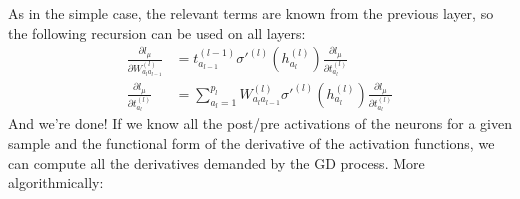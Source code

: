\documentclass{article}
\begin{document}
As in the simple case, the relevant terms are known from the previous layer, so the following recursion can be used on all layers:
\begin{align}
    \frac{\partial l_{\mu}}{\partial W^{(l)}_{a_{l} a_{l-1}}}
    &=
    t^{(l-1)}_{a_{l-1}} \sigma'^{(l)} (h^{(l)}_{a_{l}})
    \frac{\partial l_{\mu}}{\partial t^{(l)}_{a_{l}}}
     \\
    \frac{\partial l_{\mu}}{\partial t^{(l)}_{a_{l}}}
    &=
    \sum_{a_{l}=1}^{p_{l}}
    W^{(l)}_{a_{l}a_{l-1}}
    \sigma'^{(l)} (h^{(l)}_{a_{l}})
    \frac{\partial l_{\mu}}{\partial t^{(l)}_{a_{l}}}
\end{align}
And we're done! If we know all the post/pre activations of the neurons for a given sample and the functional form of the derivative of the activation functions, we can compute all the derivatives demanded by the GD process. More algorithmically:
\end{document}

